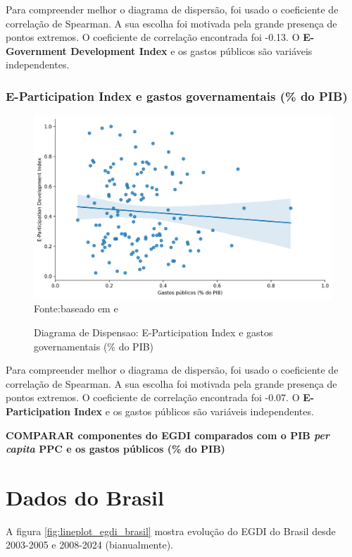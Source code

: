 Para compreender melhor o diagrama de dispersão, foi usado o coeficiente de correlação de Spearman. A sua escolha foi motivada pela grande presença de pontos extremos. O coeficiente de correlação encontrada foi -0.13. O \textbf{E-Government Development Index} e os gastos públicos são variáveis independentes.

\subsubsection{E-Participation Index e gastos governamentais (\% do PIB)}

\begin{figure}[H]
	\centering
	\caption{Diagrama de Dispensao: E-Participation Index e gastos governamentais (\% do PIB)}
	\includegraphics[width=1\linewidth]{figuras/egdi/dispersao_epart_govexpenditure}
	\label{fig:dispersao_epart_govexpenditure}
	\footnotesize{Fonte:baseado em \cite{ONU_EGDI_mapa} e \cite{FMI_gov_expenditure}}
\end{figure}

Para compreender melhor o diagrama de dispersão, foi usado o coeficiente de correlação de Spearman. A sua escolha foi motivada pela grande presença de pontos extremos. O coeficiente de correlação encontrada foi -0.07. O \textbf{E-Participation Index} e os gastos públicos são variáveis independentes.

\textbf{COMPARAR componentes do EGDI comparados com o PIB \textit{per capita} PPC e os gastos públicos (\% do PIB)}

\section{Dados do Brasil}

A figura \ref{fig:lineplot_egdi_brasil} mostra evolução do EGDI do Brasil desde 2003-2005 e 2008-2024 (bianualmente).

